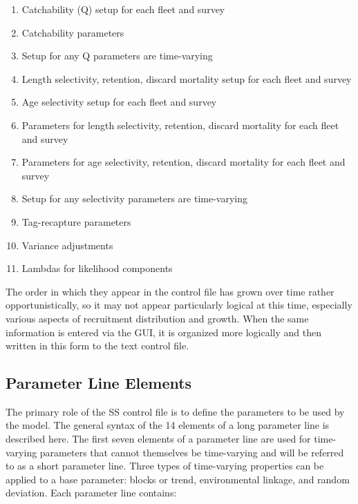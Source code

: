 \begin{enumerate}
		\item Catchability (Q) setup for each fleet and survey
		\item Catchability parameters
		\item Setup for any Q parameters are time-varying
		\\
		\item Length selectivity, retention, discard mortality setup for each fleet and survey
		\item Age selectivity setup for each fleet and survey
		\item Parameters for length selectivity, retention, discard mortality for each fleet and survey
		\item Parameters for age selectivity, retention, discard mortality for each fleet and survey
		\item Setup for any selectivity parameters are time-varying
		\\
		\item Tag-recapture parameters
		\\
		\item Variance adjustments
		\item Lambdas for likelihood components
	\end{enumerate}
The order in which they appear in the control file has grown over time rather opportunistically, so it may not appear particularly logical at this time, especially various aspects of recruitment distribution and growth.  When the same information is entered via the GUI, it is organized more logically and then written in this form to the text control file.


\subsection{Parameter Line Elements}
The primary role of the SS control file is to define the parameters to be used by the model.  The general syntax of the 14 elements of a long parameter line is described here.  The first seven elements of a parameter line are used for time-varying parameters that cannot themselves be time-varying and will be referred to as a short parameter line.  Three types of time-varying properties can be applied to a base parameter:  blocks or trend, environmental linkage, and random deviation.  Each parameter line contains:

